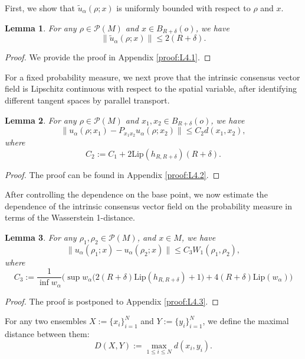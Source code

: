 \documentclass[11pt]{amsart}
\newtheorem{lemma}{Lemma}[section]
\newcommand{\p}{o}%
\newcommand{\dist}{d}%
\begin{document}
First, we show that $\tilde u_\alpha(\rho;x)$ is uniformly bounded with respect to $\rho$ and $x$.
\begin{lemma}\label{L4.1}
For any $\rho\in\mathcal{P}(M)$ and $x\in B_{R+\delta}(\p)$, we have
\[
\|\tilde{u}_\alpha(\rho;x)\|\leq 2(R+\delta).
\]
\end{lemma}

\begin{proof}
We provide the proof in Appendix  \ref{proof:L4.1}.
\end{proof}


For a fixed probability measure, we next prove that the intrinsic consensus vector field is Lipschitz continuous with respect to the spatial variable, after identifying different tangent spaces by parallel transport.

\begin{lemma}\label{L4.2}
For any $\rho\in\mathcal{P}(M)$ and $x_1, x_2\in B_{R+\delta}(\p)$, we have
\[
\|u_\alpha(\rho;x_1)-P_{x_1x_2}u_\alpha(\rho;x_2)\|\leq C_2\dist(x_1, x_2),
\]
where
\[
C_2:=C_1+2\mathrm{Lip}(h_{R,R+\delta})(R+\delta).
\]
\end{lemma}

\begin{proof}
The proof can be found in Appendix \ref{proof:L4.2}.


\end{proof}

 After controlling the dependence on the base point, we now estimate the dependence of the intrinsic consensus vector field on the probability measure in terms of the Wasserstein 1-distance.

\begin{lemma}\label{L4.3}
For any $\rho_1, \rho_2\in \mathcal{P}(M)$, and $x\in M$, we have
\[
\|u_\alpha(\rho_1;x)-u_\alpha(\rho_2;x)\|\leq C_3W_1(\rho_1, \rho_2),
\]
where
\[
C_3:=\frac{1}{\inf w_\alpha}\bigg(\sup w_\alpha\big(2(R+\delta)\mathrm{Lip}(h_{R,R+\delta})+1\big)+4(R+\delta)\mathrm{Lip}(w_\alpha)\bigg)
\]
\end{lemma}


\begin{proof}
The proof is postponed to Appendix \ref{proof:L4.3}.



\end{proof}


For any two ensembles $X:=\{x_i\}_{i=1}^N$ and $Y:=\{y_i\}_{i=1}^N$, we define the maximal distance between them:
\[
D(X,Y):=\max_{1\leq i\leq N}\dist(x_i, y_i).
\]
\end{document}
